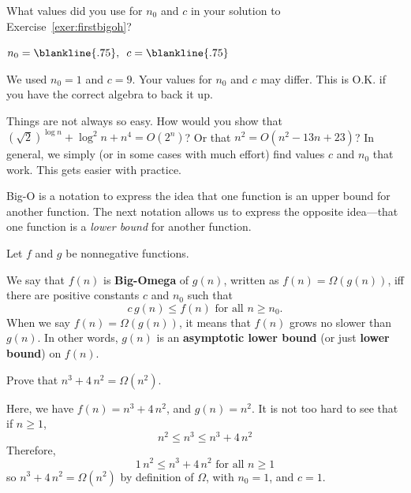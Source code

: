 \begin{ques}
What values did you use for $n_0$ and $c$ in your solution to 
Exercise~\ref{exer:firstbigoh}?

\noindent
$n_0=\blankline{.75},\, \, \,  c=\blankline{.75}$
\begin{answer}
We used $n_0=1$ and $c=9$. 
Your values for $n_0$ and $c$ may differ.  
This is O.K. if you have the correct algebra to back it up.
\end{answer}
\end{ques}


Things are not always so easy.  How would you show that 
$(\sqrt{2})^{\log n}+\log^2 n + n^4=O(2^n)$?
Or that $n^2=O(n^2-13n+23)$?
In general, we simply (or in some cases with much effort) 
find values $c$ and $n_0$ that work. 
This gets easier with practice.

Big-O is a notation to express the idea that one function is an upper bound for 
another function.  The next notation allows us to express the opposite idea---that one
function is a {\em lower bound} for another function.

\begin{df}
Let $f$ and $g$ be nonnegative functions.

\medskip
\noindent
\begin{minipage}{.4\textwidth}
We say that $f(n)$ is {\bf Big-Omega} of $g(n)$, written as 
$f(n) = \Omega(g(n))$,
iff there are positive constants $c$ and $n_{0}$ such that
$$c\,g(n) \leq f(n) \mbox{ for all } n \geq n_0.$$
When we say $f(n)=\Omega(g(n))$, it means that 
 $f(n)$ grows no slower than $g(n)$. In other words,
$g(n)$ is an {\bf asymptotic lower bound} (or just {\bf lower bound}) 
on $f(n)$.
\end{minipage}
\hfill
\begin{minipage}{.55\textwidth}
\end{minipage}
\end{df}


\begin{exa} 
Prove that $n^3+4\,n^2=\Omega(n^2)$.
\begin{pf}
Here, we have $f(n) = n^3+4\,n^2$, and $g(n) = n^2$.
It is not too hard to see that if $n\geq 1$, 
$$n^2\leq n^3\leq n^3+4\,n^2$$
Therefore, 
$$1\,n^2\leq n^3+4\,n^2 \mbox{ for all } n\geq 1$$
so $n^3+4\,n^2=\Omega(n^2)$ by definition of $\Omega$, with $n_0=1$, and $c=1$.
\end{pf}
\end{exa}


